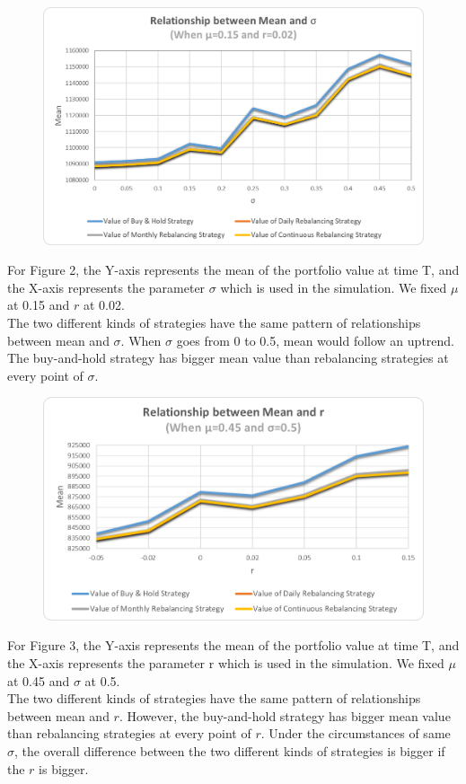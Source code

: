 \documentclass[
10pt, %
a4paper, %
oneside, %
headinclude,footinclude, %
BCOR5mm, %
]{scrartcl}
\begin{document}
\begin{figure}[H]
	\centering
	\includegraphics[width=0.7\linewidth]{mean_sigma_015_002}
	\caption{}
	\label{fig:meansigma015002}
\end{figure}
For Figure 2, the Y-axis represents the mean of the portfolio value at time T, and the X-axis represents the parameter $\sigma$ which is used in the simulation. We fixed $\mu$ at 0.15 and $r$ at 0.02.\\

The two different kinds of strategies have the same pattern of relationships between mean and $\sigma$. When $\sigma$ goes from 0 to 0.5, mean would follow an uptrend. The buy-and-hold strategy has bigger mean value than rebalancing strategies at every point of $\sigma$. \\

\begin{figure}[H]
	\centering
	\includegraphics[width=0.7\linewidth]{mean_r_045_050}
	\caption{}
	\label{fig:meanr045050}
\end{figure}

For Figure 3, the Y-axis represents the mean of the portfolio value at time T, and the X-axis represents the parameter r which is used in the simulation. We fixed $\mu$ at 0.45 and $\sigma$ at 0.5.\\

The two different kinds of strategies have the same pattern of relationships between mean and $r$. However, the buy-and-hold strategy has bigger mean value than rebalancing strategies at every point of $r$. Under the circumstances of same $\sigma$, the overall difference between the two different kinds of strategies is bigger if the $r$ is bigger. \\
\end{document}
